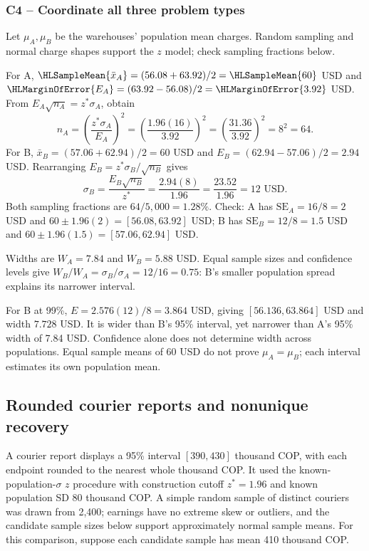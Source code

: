\subsubsection*{C4 -- Coordinate all three problem types}\label{sol:c4-advanced-1}
Let $\mu_A,\mu_B$ be the warehouses' population mean charges. Random sampling and normal charge shapes support the $z$ model; check sampling fractions below.

For A, $\HLSampleMean{\bar x_A}=(56.08+63.92)/2=\HLSampleMean{60}$ USD and $\HLMarginOfError{E_A}=(63.92-56.08)/2=\HLMarginOfError{3.92}$ USD.
From $E_A\sqrt{n_A}=z^*\sigma_A$, obtain
\[
n_A=\left(\frac{z^*\sigma_A}{E_A}\right)^2
=\left(\frac{1.96(16)}{3.92}\right)^2
=\left(\frac{31.36}{3.92}\right)^2=8^2=64.
\]
For B, $\bar x_B=(57.06+62.94)/2=60$ USD and $E_B=(62.94-57.06)/2=2.94$ USD. Rearranging $E_B=z^*\sigma_B/\sqrt{n_B}$ gives
\[
\sigma_B=\frac{E_B\sqrt{n_B}}{z^*}
=\frac{2.94(8)}{1.96}=\frac{23.52}{1.96}=12\text{ USD}.
\]
Both sampling fractions are $64/5{,}000=1.28\%$. Check: A has $\mathrm{SE}_A=16/8=2$ USD and $60\pm1.96(2)=[56.08,63.92]$ USD; B has $\mathrm{SE}_B=12/8=1.5$ USD and $60\pm1.96(1.5)=[57.06,62.94]$ USD.

Widths are $W_A=7.84$ and $W_B=5.88$ USD. Equal sample sizes and confidence levels give $W_B/W_A=\sigma_B/\sigma_A=12/16=0.75$: B's smaller population spread explains its narrower interval.

For B at 99\%, $E=2.576(12)/8=3.864$ USD, giving $[56.136,63.864]$ USD and width $7.728$ USD. It is wider than B's 95\% interval, yet narrower than A's 95\% width of 7.84 USD. Confidence alone does not determine width across populations. Equal sample means of 60 USD do not prove $\mu_A=\mu_B$; each interval estimates its own population mean.

\clearpage
\subsection{Rounded courier reports and nonunique recovery}\label{prob:c4-advanced-2}
A courier report displays a 95\% interval $[390,430]$ thousand COP, with each endpoint rounded to the nearest whole thousand COP. It used the known-population-$\sigma$ $z$ procedure with construction cutoff $z^*=1.96$ and known population SD 80 thousand COP. A simple random sample of distinct couriers was drawn from 2,400; earnings have no extreme skew or outliers, and the candidate sample sizes below support approximately normal sample means. For this comparison, suppose each candidate sample has mean 410 thousand COP.
